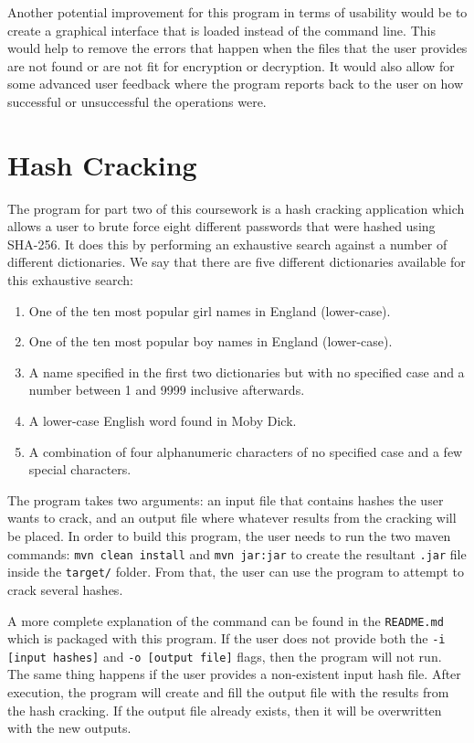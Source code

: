 \documentclass[10pt,journal,compsoc]{IEEEtran}
\begin{document}
Another potential improvement for this program in terms of usability would be
to create a graphical interface that is loaded instead of the command line.
This would help to remove the errors that happen when the files that the user
provides are not found or are not fit for encryption or decryption. It would
also allow for some advanced user feedback where the program reports back to
the user on how successful or unsuccessful the operations were.

\section{Hash Cracking}\label{sec:hashcracking}

The program for part two of this coursework is a hash cracking application
which allows a user to brute force eight different passwords that were hashed
using SHA-256. It does this by performing an exhaustive search against a number
of different dictionaries. We say that there are five different dictionaries
available for this exhaustive search:

\begin{enumerate}
	\item One of the ten most popular girl names in England (lower-case).
	\item One of the ten most popular boy names in England (lower-case).
	\item A name specified in the first two dictionaries but with no specified
	case and a number between 1 and 9999 inclusive afterwards.
	\item A lower-case English word found in Moby Dick.
	\item A combination of four alphanumeric characters of no specified case
	and a few special characters.
\end{enumerate}

The program takes two arguments: an input file that contains hashes the user
wants to crack, and an output file where whatever results from the cracking
will be placed. In order to build this program, the user needs to run the two
maven commands: \texttt{mvn clean install} and \texttt{mvn jar:jar} to create
the resultant \texttt{.jar} file inside the \texttt{target/} folder. From that,
the user can use the program to attempt to crack several hashes.

A more complete explanation of the command can be found in the
\texttt{README.md} which is packaged with this program. If the user does not
provide both the \texttt{-i [input hashes]} and \texttt{-o [output file]}
flags, then the program will not run. The same thing happens if the user
provides a non-existent input hash file. After execution, the program will
create and fill the output file with the results from the hash cracking. If the
output file already exists, then it will be overwritten with the new outputs.
\end{document}
